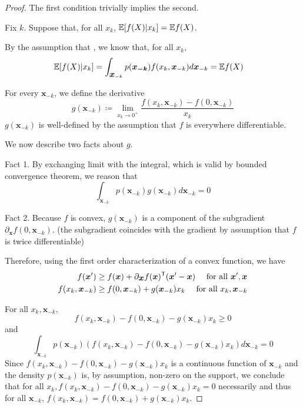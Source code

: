 \begin{proof}

The first condition trivially implies the second.

Fix $k$. Suppose that, for all $x_k$, ${\mathbb E}[ f(X) | x_k] = {\mathbb E} f(X)$. 

By the assumption that , we know that, for all $x_k$,
\begin{align*}
 {\mathbb E}[ f(X) | x_k ] &=  \int_{\mbox{\boldmath $x$}_{-k}} p(\mbox{\boldmath $x_{-k}$}) f(x_k,\mbox{\boldmath $x$}_{-k}) d \mbox{\boldmath $x$}_{-k} = {\mathbb E} f(X)
\end{align*}

For every $\mathbf{x}_{-k}$, we define the derivative
\[
g(\mathbf{x}_{-k}) \coloneqq  \lim_{x_k \rightarrow 0^+} \frac{f(x_k, \mathbf{x}_{-k}) - f(0, \mathbf{x}_{-k})}{x_k}
\]
$g(\mathbf{x}_{-k})$ is well-defined by the assumption that $f$ is everywhere differentiable.

We now describe two facts about $g$.

Fact 1. By exchanging limit with the integral, which is valid by bounded convergence theorem, we reason that 
\[
\int_{\mathbf{x}_{-k}} p(\mathbf{x}_{-k}) g(\mathbf{x}_{-k}) d \mathbf{x}_{-k} = 0
\]

Fact 2. Because $f$ is convex, $g(\mathbf{x}_{-k})$ is a component of the subgradient $\partial_{\mathbf{x}} f(0, \mathbf{x}_{-k})$. (the subgradient coincides with the gradient by assumption that $f$ is twice differentiable)

Therefore, using the first order characterization of a convex function, we have
\begin{align*}
f(\mbox{\boldmath $x$}') &\geq f( \mbox{\boldmath $x$}) + \partial_{\mbox{\boldmath $x$}} f(\mbox{\boldmath $x$})^{\mathsf{T}} (\mbox{\boldmath $x$}' - \mbox{\boldmath $x$}) \quad \textrm{ for all } \mbox{\boldmath $x$}', \mbox{\boldmath $x$} \\
f(x_k, \mbox{\boldmath $x$}_{-k}) &\geq f(0, \mbox{\boldmath $x$}_{-k}) + g(\mbox{\boldmath $x$}_{-k}) x_k \quad \textrm{ for all } x_k, \mbox{\boldmath $x$}_{-k}
\end{align*}


For all $x_k, \mathbf{x}_{-k}$, 
\[
f(x_k, \mathbf{x}_{-k}) - f(0, \mathbf{x}_{-k}) - g(\mathbf{x}_{-k}) x_k \geq 0
\]
and
\[
\int_{\mathbf{x}_{-k}} p(\mathbf{x}_{-k}) (f(x_k, \mathbf{x}_{-k}) - f(0, \mathbf{x}_{-k}) - g(\mathbf{x}_{-k}) x_k) d\mathbf{x}_{-k} = 0
\]
Since $f(x_k, \mathbf{x}_{-k}) - f(0, \mathbf{x}_{-k}) - g(\mathbf{x}_{-k}) x_k$ is a continuous function of $\mathbf{x}_{-k}$ and the density $p(\mathbf{x}_{-k})$ is, by assumption, non-zero on the support, we conclude that for all $x_k, f(x_k, \mathbf{x}_{-k}) - f(0, \mathbf{x}_{-k}) - g(\mathbf{x}_{-k}) x_k =0 $ necessarily and thus for all $\mathbf{x}_{-k}$, $f(x_k, \mathbf{x}_{-k}) = f(0, \mathbf{x}_{-k}) + g(\mathbf{x}_{-k}) x_k$.


\end{proof}
